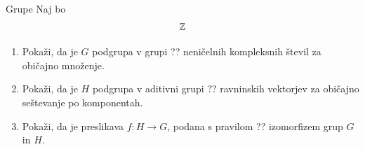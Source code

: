 \begin{frame}{Grupe}
	Naj bo
	\[\mathbb{Z}\]
	\begin{enumerate}
		\item
			Pokaži, da je $G$ podgrupa v grupi ??
			neničelnih kompleksnih števil za običajno množenje.
		\item
			Pokaži, da je $H$ podgrupa v aditivni grupi ??
			ravninskih vektorjev za običajno seštevanje po komponentah.
		\item
			Pokaži, da je preslikava $f:H\to G$, podana s pravilom
			??
			izomorfizem grup $G$ in $H$.
	\end{enumerate}
\end{frame}
